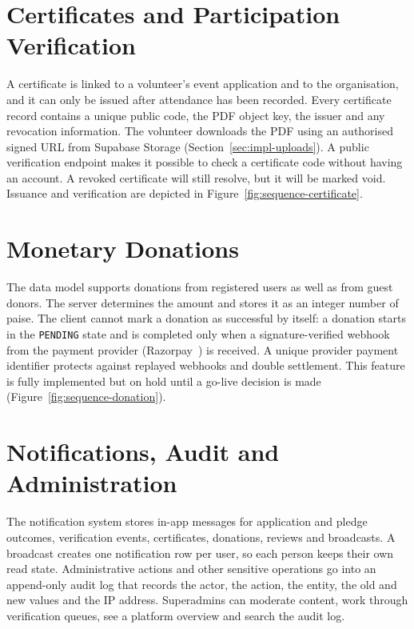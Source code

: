 
\section{Certificates and Participation Verification}
\label{sec:impl-certificates}
A certificate is linked to a volunteer's event application and to the organisation, and it can only be issued after attendance has been recorded. Every certificate record contains a unique public code, the PDF object key, the issuer and any revocation information. The volunteer downloads the PDF using an authorised signed URL from Supabase Storage (Section~\ref{sec:impl-uploads}). A public verification endpoint makes it possible to check a certificate code without having an account. A revoked certificate will still resolve, but it will be marked void. Issuance and verification are depicted in Figure~\ref{fig:sequence-certificate}.


\section{Monetary Donations}
\label{sec:impl-donations}
The data model supports donations from registered users as well as from guest donors. The server determines the amount and stores it as an integer number of paise. The client cannot mark a donation as successful by itself: a donation starts in the \texttt{PENDING} state and is completed only when a signature-verified webhook from the payment provider (Razorpay~\cite{razorpay}) is received. A unique provider payment identifier protects against replayed webhooks and double settlement. This feature is fully implemented but on hold until a go-live decision is made (Figure~\ref{fig:sequence-donation}).


\section{Notifications, Audit and Administration}
\label{sec:impl-notifications}
The notification system stores in-app messages for application and pledge outcomes, verification events, certificates, donations, reviews and broadcasts. A broadcast creates one notification row per user, so each person keeps their own read state. Administrative actions and other sensitive operations go into an append-only audit log that records the actor, the action, the entity, the old and new values and the IP address. Superadmins can moderate content, work through verification queues, see a platform overview and search the audit log.

